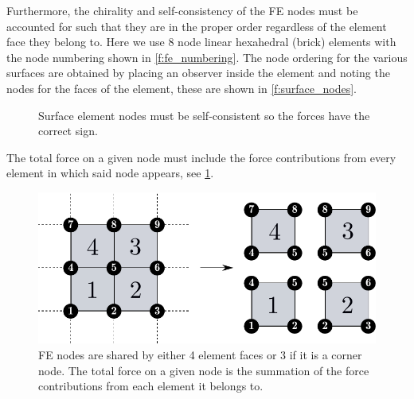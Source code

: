 \documentclass[11pt]{iopart}
\begin{document}
Furthermore, the chirality and self-consistency of the  FE nodes must be accounted for such that they are in the proper order regardless of the element face they belong to. Here we use 8  node linear hexahedral (brick) elements with the node numbering shown in \cref{f:fe_numbering}. The node ordering for the various surfaces are obtained by placing an observer inside the element and noting the nodes for the faces of the element, these are shown in \cref{f:surface_nodes}.
%
\begin{figure}
    \centering
    \hfill
    \caption{Surface element nodes must be self-consistent so the forces have the correct sign.}
\end{figure}
%
The total force on a given node must include the force contributions from every element in which said node appears, see \cref{f:shared_node}.
%
\begin{figure}
    \centering
    \includegraphics[width=\linewidth]{images/lrse_thread_map.pdf}
    \caption{FE nodes are shared by either 4 element faces or 3 if it is a corner node. The total force on a given node is the summation of the force contributions from each element it belongs to.}
    \label{f:shared_node}
\end{figure}
\end{document}
